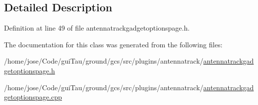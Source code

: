 \subsection{Detailed Description}


Definition at line 49 of file antennatrackgadgetoptionspage.\-h.



The documentation for this class was generated from the following files\-:\begin{DoxyCompactItemize}
\item 
/home/jose/\-Code/gui\-Tau/ground/gcs/src/plugins/antennatrack/\hyperlink{antennatrackgadgetoptionspage_8h}{antennatrackgadgetoptionspage.\-h}\item 
/home/jose/\-Code/gui\-Tau/ground/gcs/src/plugins/antennatrack/\hyperlink{antennatrackgadgetoptionspage_8cpp}{antennatrackgadgetoptionspage.\-cpp}\end{DoxyCompactItemize}
